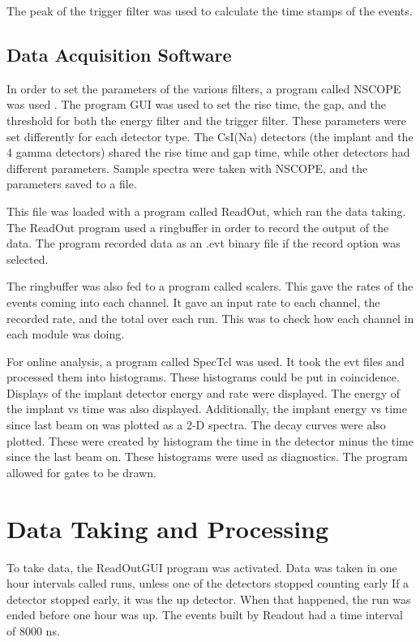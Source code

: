 \documentclass[main.tex]{subfiles}
\begin{document}
The peak of the trigger filter was used to calculate the time stamps of the events.  

\subsection{Data Acquisition Software}
In order to set the parameters of the various filters, a program called NSCOPE was used \cite{DAQ17}.
The program GUI was used to set the rise time, the gap, and the threshold for both the energy filter and the trigger filter.
These parameters were set differently for each detector type.
The CsI(Na) detectors (the implant and the 4 gamma detectors) shared the rise time and gap time, while other detectors had different parameters.
Sample spectra were taken with NSCOPE, and the parameters saved to a file.

This file was loaded with a program called ReadOut, which ran the data taking.
The ReadOut program used a ringbuffer in order to record the output of the data.
The program recorded data as an .evt binary file if the record option was selected.

The ringbuffer was also fed to a program called scalers.
This gave the rates of the events coming into each channel.
It gave an input rate to each channel, the recorded rate, and the total over each run.
This was to check how each channel in each module was doing.

For online analysis, a program called SpecTcl was used.
It took the evt files and processed them into histograms.
These histograms could be put in coincidence.
Displays of the implant detector energy and rate were displayed.
The energy of the implant vs time was also displayed.
Additionally, the implant energy vs time since last beam on was plotted as a 2-D spectra.
The decay curves were also plotted.
These were created by histogram the time in the detector minus the time since the last beam on.
These histograms were used as diagnostics. 
The program allowed for gates to be drawn.


\section{Data Taking and Processing}
To take data, the ReadOutGUI program was activated. 
Data was taken in one hour intervals called runs, unless one of the detectors stopped counting early
If a detector stopped early, it was the up detector.
When that happened, the run was ended before one hour was up. 
The events built by Readout had a time interval of 8000 ns.
\end{document}
